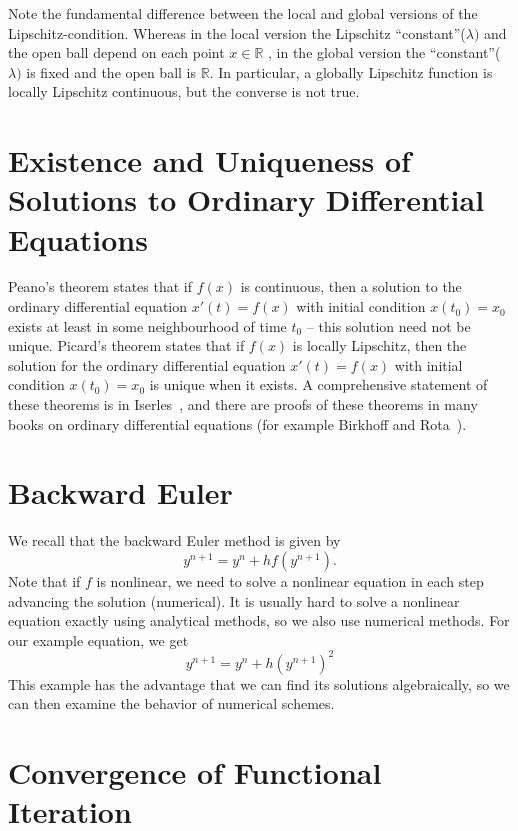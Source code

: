 Note the fundamental difference between the local and global versions of the Lipschitz-condition. Whereas in the local version the Lipschitz ``constant''($\lambda)$ and the open ball depend on each point $x\in\mathbb{R}$ , in the global version the ``constant''($\lambda)$ is fixed and the open ball is $\mathbb{R}$. In particular, a globally Lipschitz function is locally Lipschitz continuous, but the converse is not true.


\section{Existence and Uniqueness of Solutions to Ordinary Differential Equations}

Peano's theorem states that if $f(x)$ is continuous, then a solution to the ordinary differential equation $x'(t)=f(x)$ with initial condition $x(t_0)=x_0$ exists  at least in some neighbourhood of time $t_0$ -- this solution need not be unique. Picard's theorem states that if $f(x)$ is locally Lipschitz, then the solution for the ordinary differential equation $x'(t)=f(x)$ with initial condition $x(t_0)=x_0$ is unique when it exists. A comprehensive statement of these theorems is in Iserles~\cite[p. 445]{Ise09}, and there are proofs of these theorems in many books on ordinary differential equations (for example Birkhoff and Rota~\cite[Chap. 6, pg.\ 192]{BirRot89}). 
 
\section{Backward Euler}

We recall that the backward Euler method is given by
\begin{equation}
y^{n+1}=y^{n}+hf(y^{n+1}).
\end{equation}
Note that if $f$ is nonlinear, we need to solve a nonlinear equation in each step advancing the solution (numerical). It is usually hard to solve a nonlinear equation exactly using analytical methods, so we also use numerical methods.  For our example equation, we get
\begin{equation}
y^{n+1}=y^{n}+h\left(y^{n+1}\right)^2
\end{equation}
This example has the advantage that we can find its solutions algebraically, so we can then examine the behavior of numerical schemes.

\section{Convergence of Functional Iteration}

